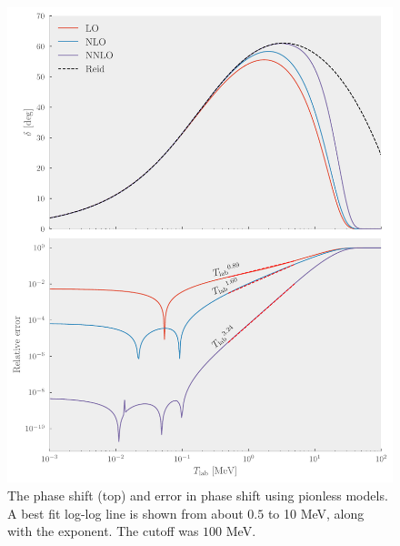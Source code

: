 \begin{figure}[pt]
  \centering
  \includegraphics{Figures/pionless_lambda.pdf}
  \caption{\label{fig:pionless_lambda} The phase shift (top) and error in phase
    shift using pionless models. A best fit log-log line is shown from about \(0.5\) to
    10 MeV, along with the exponent. The cutoff was \(100\) MeV.}
\end{figure}


